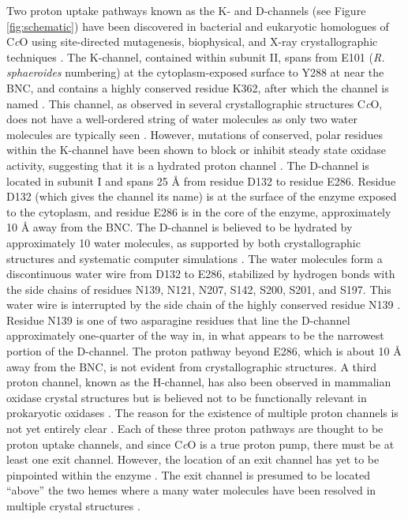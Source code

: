 Two proton uptake pathways known as the K- and D-channels (see Figure \ref{fig:schematic}) have been discovered in bacterial and eukaryotic homologues of C\emph{c}O using site-directed mutagenesis, biophysical, and X-ray crystallographic techniques \cite{Tsukihara:1996p10224,Brzezinski:1998p5542,Pfitzner:1998p10266,SvenssonEk:2002p5595,Lee:2010p8614}. The K-channel, contained within subunit II, spans from E101 (\emph{R. sphaeroides} numbering) at the cytoplasm-exposed surface to Y288 at near the BNC, and contains a highly conserved residue K362, after which the channel is named \cite{Tomson:2003p10255}. This channel, as observed in several crystallographic structures C\emph{c}O, does not have a well-ordered string of water molecules as only two water molecules are typically seen \cite{Tsukihara:1996p10224,Qin:2008p7672,SvenssonEk:2002p5595}. However, mutations of conserved, polar residues within the K-channel have been shown to block or inhibit steady state oxidase activity, suggesting that it is a hydrated proton channel \cite{Pfitzner:1998p10266,Zaslavsky:1998p10317,Ganesan:2010p8417}. The D-channel is located in subunit I and spans 25 Å from residue D132 to residue E286. Residue D132 (which gives the channel its name) is at the surface of the enzyme exposed to the cytoplasm, and residue E286 is in the core of the enzyme, approximately 10 Å away from the BNC. The D-channel is believed to be hydrated by approximately 10 water molecules, as supported by both crystallographic structures \cite{SvenssonEk:2002p5595} and systematic computer simulations \cite{Henry:2009p4543}. The water molecules form a discontinuous water wire from D132 to E286, stabilized by hydrogen bonds with the side chains of residues N139, N121, N207, S142, S200, S201, and S197. This water wire is interrupted by the side chain of the highly conserved residue N139 \cite{Qin:2006p7708}. Residue N139 is one of two asparagine residues that line the D-channel approximately one-quarter of the way in, in what appears to be the narrowest portion of the D-channel. The proton pathway beyond E286, which is about 10 Å away from the BNC, is not evident from crystallographic structures.
A third proton channel, known as the H-channel, has also been observed in mammalian oxidase crystal structures but is believed not to be functionally relevant in prokaryotic oxidases \cite{Tsukihara:1996p10224,Lee:2000p10296}. The reason for the existence of multiple proton channels is not yet entirely clear \cite{Gennis:2004p10239}. Each of these three proton pathways are thought to be proton uptake channels, and since C\emph{c}O is a true proton pump, there must be at least one exit channel. However, the location of an exit channel has yet to be pinpointed within the enzyme \cite{Gennis:2004p10239,Sugitani:2009p5715}. The exit channel is presumed to be located ``above'' the two hemes where a many water molecules have been resolved in multiple crystal structures \cite{SvenssonEk:2002p5595,Qin:2006p7708,Muramoto:2007p8383,Durr:2008p6162,Koepke:2009p10494,Liu:2011p9691}.

